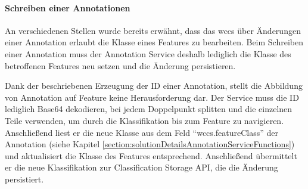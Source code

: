     \paragraph{Schreiben einer Annotationen}
    An verschiedenen Stellen wurde bereits erwähnt,
    dass das \gls{wccs} über Änderungen einer Annotation erlaubt die Klasse eines Features zu bearbeiten.
    Beim Schreiben einer Annotation muss der Annotation Service deshalb lediglich
    die Klasse des betroffenen Features neu setzen und die Änderung persistieren.

    Dank der beschriebenen Erzeugung der ID einer Annotation,
    stellt die Abbildung von Annotation auf Feature keine Herausforderung dar.
    Der Service muss die ID lediglich Base64 dekodieren,
    bei jedem Doppelpunkt splitten und die einzelnen Teile verwenden,
    um durch die Klassifikation bis zum Feature zu navigieren.
    Anschließend liest er die neue Klasse aus dem Feld "`wccs.featureClass"' der Annotation
    (siehe Kapitel \ref{section:solutionDetailsAnnotationServiceFunctions})
    und aktualisiert die Klasse des Features entsprechend.
    Anschließend übermittelt er die neue Klassifikation zur Classification Storage API,
    die die Änderung persistiert.
